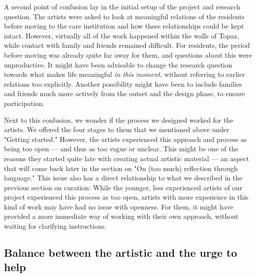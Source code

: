 \documentclass[authordate, empirical]{jote-new-article}
\begin{document}
	A second point of confusion lay in the initial setup of the project and research question. The artists were asked to look at meaningful relations of the residents before moving to the care institution and how these relationships could be kept intact. However, virtually all of the work happened within the walls of Topaz, while contact with family and friends remained difficult. For residents, the period before moving was already quite far away for them, and questions about this were unproductive. It might have been advisable to change the research question towards what makes life meaningful \emph{in this moment}, without referring to earlier relations too explicitly. Another possibility might have been to include families and friends much more actively from the outset and the design phase, to ensure participation.







	Next to this confusion, we wonder if the process we designed worked for the artists. We offered the four stages to them that we mentioned above under "Getting started." However, the artists experienced this approach and process as being too open --- and thus as too vague or unclear. This might be one of the reasons they started quite late with creating actual artistic material --- an aspect that will come back later in the section on "On (too much) reflection through language." This issue also has a direct relationship to what we described in the previous section on curation: While the younger, less experienced artists of our project experienced this process as too open, artists with more experience in this kind of work may have had no issue with openness. For them, it might have provided a more immediate way of working with their own approach, without waiting for clarifying instructions.







	\subsection{Balance between the artistic and the urge to help}
\end{document}
